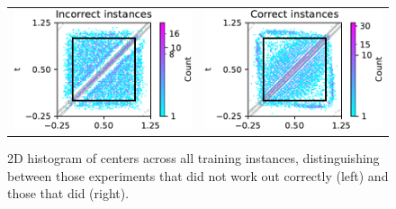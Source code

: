\documentclass[12pt]{report} %
\begin{document}
\begin{figure}
  \hspace*{-1cm}
  \begin{tabular}{cc}
    \includegraphics[width=.45\textwidth]{imagenes/experiments/2d/hyperbolic_1d/circle_c900_hyperbolic_1d_gaussian_kernel_incorrect.pdf} &
    \includegraphics[width=.45\textwidth]{imagenes/experiments/2d/hyperbolic_1d/circle_c900_hyperbolic_1d_gaussian_kernel_correct.pdf}  
  \end{tabular}
  \caption{2D histogram of centers across all training instances, distinguishing between those experiments that did not work out correctly (left) and those that did (right).}
  \label{fig:comparison-centers-histogram-1d-wave}
\end{figure}
\end{document}
